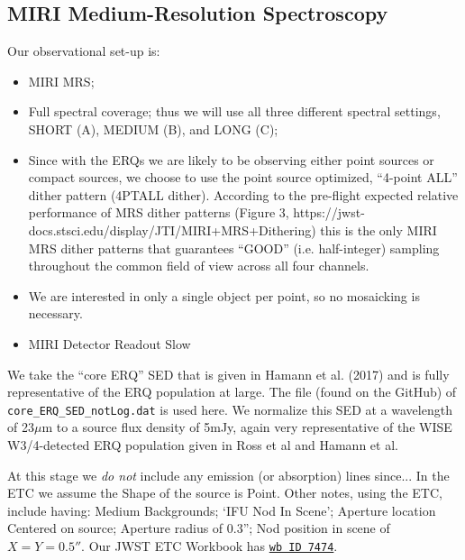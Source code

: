     \subsection{MIRI Medium-Resolution Spectroscopy}
    Our observational set-up is:
         \begin{itemize}
           \item MIRI MRS; 
           \item Full spectral coverage; thus we will use all three different spectral settings, SHORT (A), MEDIUM (B), and LONG (C);  
           \item Since with the ERQs we are likely to be observing
             either point sources or compact sources, we choose to use the point
             source optimized, ``4-point ALL'' dither pattern (4PTALL
             dither). According to the pre-flight expected relative performance of
             MRS dither patterns (Figure 3,
             https://jwst-docs.stsci.edu/display/JTI/MIRI+MRS+Dithering) this is
             the only MIRI MRS dither patterns that guarantees ``GOOD''
             (i.e. half-integer) sampling throughout the common field of view
             across all four channels.
           \item We are interested in only a single object per point, so no mosaicking is necessary.  
           \item{MIRI Detector Readout Slow}
         \end{itemize}
         
\smallskip \smallskip 
\noindent
We take the ``core ERQ'' SED that is given in Hamann et al. (2017) and
is fully representative of the ERQ population at large.  The file
(found on the GitHub) of {\tt core\_ERQ\_SED\_notLog.dat} is used
here.  We normalize this SED at a wavelength of 23$\mu$m to a source
flux density of 5mJy, again very representative of the WISE
W3/4-detected ERQ population given in Ross et al and Hamann et al.

\smallskip \smallskip 
\noindent
At this stage we {\it do not} include any emission (or absorption)
lines since...  In the ETC we assume the Shape of the source is Point.
Other notes, using the ETC, include having: Medium Backgrounds; `IFU
Nod In Scene'; Aperture location Centered on source; Aperture radius
of 0.3''; Nod position in scene of $X=Y=0.5''$.  Our JWST ETC Workbook
has \href{https://jwst.etc.stsci.edu/workbook.html?wb_id=7474}{{\tt wb
ID 7474}}.



